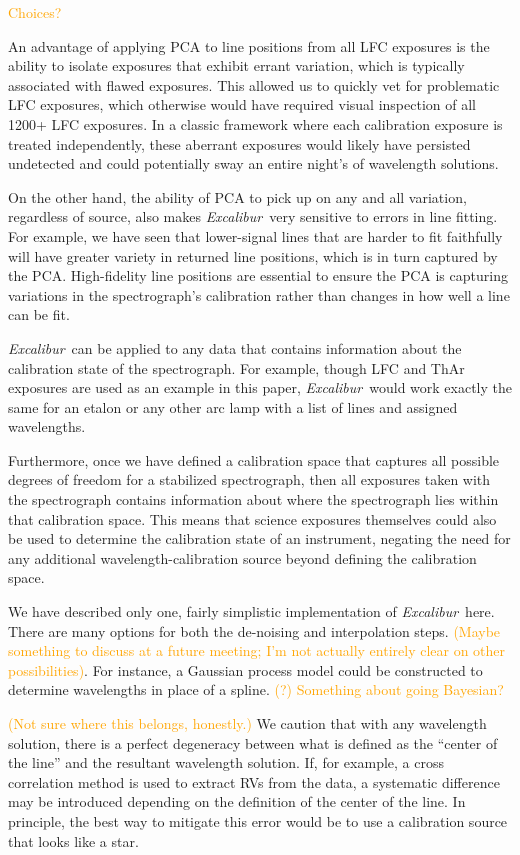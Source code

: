\documentclass[twocolumn]{aastex63}
\newcommand{\lz}[1]{\textcolor{orange}{#1}}
\newcommand{\project}[1]{\textsl{#1}}
\newcommand{\name}{\project{Excalibur}}
\begin{document}
\lz{Choices?}

An advantage of applying PCA to line positions from all LFC exposures is the ability to isolate exposures that exhibit errant variation, which is typically associated with flawed exposures.  This allowed us to quickly vet for problematic LFC exposures, which otherwise would have required visual inspection of all 1200+ LFC exposures.  In a classic framework where each calibration exposure is treated independently, these aberrant exposures would likely have persisted undetected and could potentially sway an entire night's of wavelength solutions.

On the other hand, the ability of PCA to pick up on any and all variation, regardless of source, also makes \name\ very sensitive to errors in line fitting.  For example, we have seen that lower-signal lines that are harder to fit faithfully will have greater variety in returned line positions, which is in turn captured by the PCA.  High-fidelity line positions are essential to ensure the PCA is capturing variations in the spectrograph's calibration rather than changes in how well a line can be fit.

\name\ can be applied to any data that contains information about the calibration state of the spectrograph.  For example, though LFC and ThAr exposures are used as an example in this paper, \name\ would work exactly the same for an etalon or any other arc lamp with a list of lines and assigned wavelengths.

Furthermore, once we have defined a calibration space that captures all possible degrees of freedom for a stabilized spectrograph, then all exposures taken with the spectrograph contains information about where the spectrograph lies within that calibration space.  This means that science exposures themselves could also be used to determine the calibration state of an instrument, negating the need for any additional wavelength-calibration source beyond defining the calibration space.

We have described only one, fairly simplistic implementation of \name\ here.  There are many options for both the de-noising and interpolation steps.  \lz{(Maybe something to discuss at a future meeting; I'm not actually entirely clear on other possibilities)}.  For instance, a Gaussian process model could be constructed to determine wavelengths in place of a spline. \lz{(?)}  \lz{Something about going Bayesian?}

\lz{(Not sure where this belongs, honestly.)}  We caution that with any wavelength solution, there is a perfect degeneracy between what is defined as the ``center of the line'' and the resultant wavelength solution.  If, for example, a cross correlation method is used to extract RVs from the data, a systematic difference may be introduced depending on the definition of the center of the line.  In principle, the best way to mitigate this error would be to use a calibration source that looks like a star.
\end{document}
